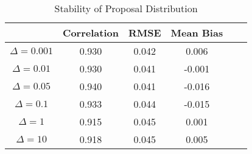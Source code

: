 \begin{table}[h!]
    \caption{Stability of Proposal Distribution}
    \label{tab:performance_stability}
    \begin{center}
        \begin{tabular}{|c|c|c|c|c|c|}
            \hline
            & Correlation & RMSE & Mean Bias\\
            \hline
            \hline
            $\Delta=0.001$ & 0.930 & 0.042 & 0.006 \\
            \hline
            $\Delta=0.01$ & 0.930 & 0.041 &  -0.001 \\
            \hline
            $\Delta=0.05$ & 0.940 & 0.041 & -0.016\\
            \hline
            $\Delta=0.1$& 0.933 & 0.044 & -0.015 \\
            \hline
            $\Delta=1$ & 0.915 &  0.045 & 0.001 \\
            \hline
            $\Delta=10$ & 0.918 &  0.045 & 0.005 \\
            \hline
        \end{tabular}
    \end{center}
\end{table}
